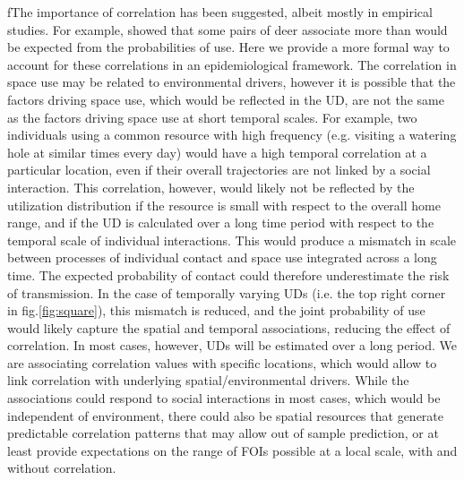 \documentclass[letterpaper]{article}
\begin{document}
fThe importance of correlation has been suggested, albeit mostly in empirical studies. For example, \citet{} showed that some pairs of deer associate more than would be expected from the probabilities of use. Here we provide a more formal way to account for these correlations in an epidemiological framework. The correlation in space use may be related to environmental drivers, however it is possible that the factors driving space use, which would be reflected in the UD, are not the same as the factors driving space use at short temporal scales. For example, two individuals using a common resource with high frequency (e.g. visiting a watering hole at similar times every day) would have a high temporal correlation at a particular location, even if their overall trajectories are not linked by a social interaction. This correlation, however, would likely not be reflected by the utilization distribution if the resource is small with respect to the overall home range, and if the UD is calculated over a long time period with respect to the temporal scale of individual interactions. This would produce a mismatch in scale between processes of individual contact and space use integrated across a long time. The expected probability of contact could therefore underestimate the risk of transmission. In the case of temporally varying UDs (i.e. the top right corner in fig.\ref{fig:square}), this mismatch is reduced, and the joint probability of use would likely capture the spatial and temporal associations, reducing the effect of correlation. In most cases, however, UDs will be estimated over a long period. 
We are associating correlation values with specific locations, which would allow to link correlation with underlying spatial/environmental drivers. While the associations could respond to social interactions in most cases, which would be independent of environment, there could also be spatial resources that generate predictable correlation patterns that may allow out of sample prediction, or at least provide expectations on the range of FOIs possible at a local scale, with and without correlation. 
\end{document}
